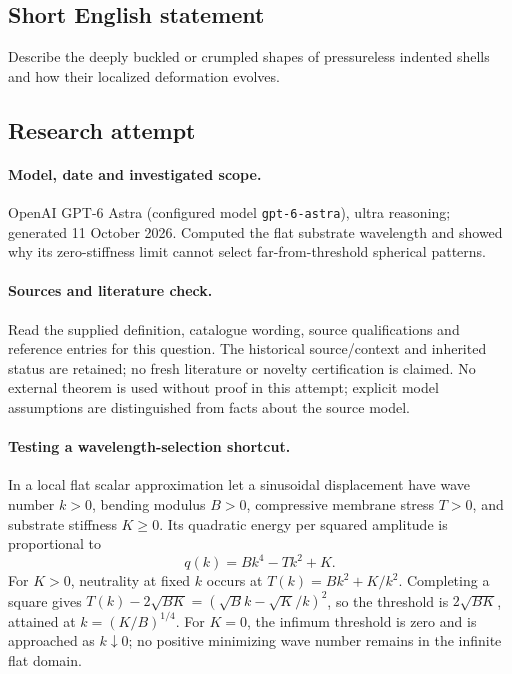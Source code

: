 \documentclass[11pt]{article}
\begin{document}
\subsection{Short English statement}
Describe the deeply buckled or crumpled shapes of pressureless indented shells and how their localized deformation evolves.
\subsection{Research attempt}
\paragraph{Model, date and investigated scope.}
OpenAI GPT-6 Astra (configured model \texttt{gpt-6-astra}), ultra reasoning; generated 11 October 2026. Computed the flat substrate wavelength and showed why its zero-stiffness limit cannot select far-from-threshold spherical patterns.

\paragraph{Sources and literature check.}
Read the supplied definition, catalogue wording, source qualifications and reference entries for this question. The historical source/context and inherited status are retained; no fresh literature or novelty certification is claimed. No external theorem is used without proof in this attempt; explicit model assumptions are distinguished from facts about the source model.

\paragraph{Testing a wavelength-selection shortcut.} In a local flat scalar approximation let a sinusoidal displacement have wave number \(k>0\), bending modulus \(B>0\), compressive membrane stress \(T>0\), and substrate stiffness \(K\ge0\). Its quadratic energy per squared amplitude is proportional to
\[
 q(k)=Bk^4-Tk^2+K.
\]
For \(K>0\), neutrality at fixed \(k\) occurs at \(T(k)=Bk^2+K/k^2\). Completing a square gives \(T(k)-2\sqrt{BK}=(\sqrt Bk-\sqrt K/k)^2\), so the threshold is \(2\sqrt{BK}\), attained at \(k=(K/B)^{1/4}\). For \(K=0\), the infimum threshold is zero and is approached as \(k\downarrow0\); no positive minimizing wave number remains in the infinite flat domain.
\end{document}
